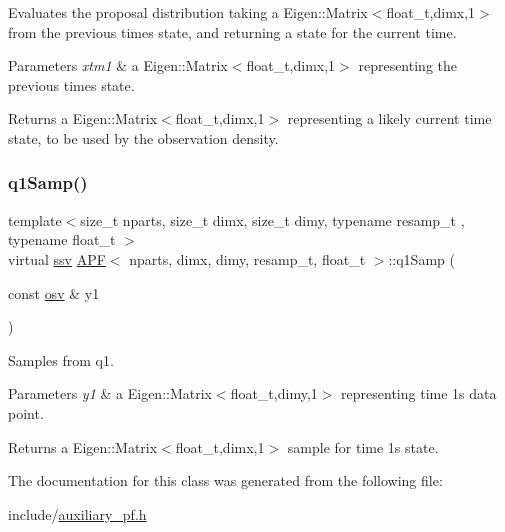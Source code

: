 Evaluates the proposal distribution taking a Eigen\+::\+Matrix$<$float\+\_\+t,dimx,1$>$ from the previous time\textquotesingle{}s state, and returning a state for the current time. 


\begin{DoxyParams}{Parameters}
{\em xtm1} & a Eigen\+::\+Matrix$<$float\+\_\+t,dimx,1$>$ representing the previous time\textquotesingle{}s state. \\
\hline
\end{DoxyParams}
\begin{DoxyReturn}{Returns}
a Eigen\+::\+Matrix$<$float\+\_\+t,dimx,1$>$ representing a likely current time state, to be used by the observation density. 
\end{DoxyReturn}
\mbox{\label{classAPF_ad4eaf5c7d00ef9c8b8529e08bda21f13}} 
\subsubsection{\texorpdfstring{q1\+Samp()}{q1Samp()}}
{\footnotesize\ttfamily template$<$size\+\_\+t nparts, size\+\_\+t dimx, size\+\_\+t dimy, typename resamp\+\_\+t , typename float\+\_\+t $>$ \\
virtual \hyperlink{classAPF_a5f96da87f00ff75af1232f9021daf06a}{ssv} \hyperlink{classAPF}{A\+PF}$<$ nparts, dimx, dimy, resamp\+\_\+t, float\+\_\+t $>$\+::q1\+Samp (\begin{DoxyParamCaption}\item[{const \hyperlink{classAPF_aa8ac25c475e54ddf21999f28727a049e}{osv} \&}]{y1 }\end{DoxyParamCaption})\hspace{0.3cm}{\ttfamily [pure virtual]}}



Samples from q1. 


\begin{DoxyParams}{Parameters}
{\em y1} & a Eigen\+::\+Matrix$<$float\+\_\+t,dimy,1$>$ representing time 1\textquotesingle{}s data point. \\
\hline
\end{DoxyParams}
\begin{DoxyReturn}{Returns}
a Eigen\+::\+Matrix$<$float\+\_\+t,dimx,1$>$ sample for time 1\textquotesingle{}s state. 
\end{DoxyReturn}


The documentation for this class was generated from the following file\+:\begin{DoxyCompactItemize}
\item 
include/\hyperlink{auxiliary__pf_8h}{auxiliary\+\_\+pf.\+h}\end{DoxyCompactItemize}
